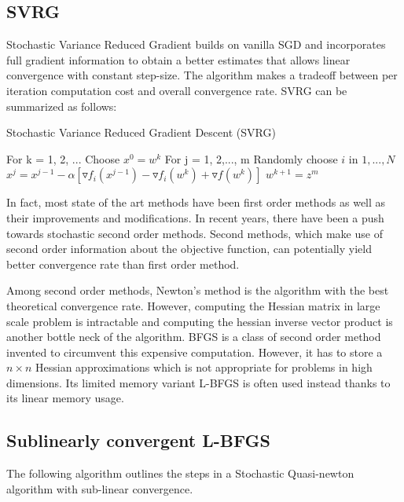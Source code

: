 \documentclass[journal,onecolumn]{IEEEtran}
\begin{document}
\subsection{SVRG}
Stochastic Variance Reduced Gradient builds on vanilla SGD and incorporates full gradient information to obtain a better estimates that allows linear convergence with constant step-size. The algorithm makes a tradeoff between per iteration computation cost and overall convergence rate. SVRG can be summarized as follows:

\begin{algorithm}[H]
	\caption{Stochastic  Variance Reduced Gradient Descent (SVRG)}
	\begin{algorithmic}
		\STATE For k = 1, 2, ...
		\STATE \hspace{2em} Choose $ x^0 = w^k $
		\STATE \hspace{2em} For j = 1, 2,..., m
		\STATE \hspace{4em} Randomly choose $ i $ in $ {1,...,N} $
		\STATE \hspace{4em} $ x^j = x^{j-1} -\alpha[\triangledown f_i(x^{j-1})-\triangledown f_i(w^k)+\triangledown f(w^k)] $
		\STATE \hspace{2em} $ w^{k+1} = z^m $
	\end{algorithmic}
\end{algorithm} 

In fact, most state of the art methods have been first order methods as well as their improvements and modifications. In recent years, there have been a push towards stochastic second order methods. Second methods, which make use of second order information about the objective function, can potentially yield better convergence rate than first order method.

Among second order methods, Newton's method is the algorithm with the best theoretical convergence rate. However, computing the Hessian matrix in large scale problem is intractable and computing the hessian inverse vector product is another bottle neck of the algorithm. BFGS is a class of second order method invented to circumvent this expensive computation. However, it has to store a $ n\times n $ Hessian approximations which is not appropriate for problems in high dimensions. Its limited memory variant L-BFGS is often used instead thanks to its linear memory usage.

\subsection{Sublinearly convergent L-BFGS}
The following algorithm outlines the steps in a Stochastic Quasi-newton algorithm with sub-linear convergence. 
\end{document}

